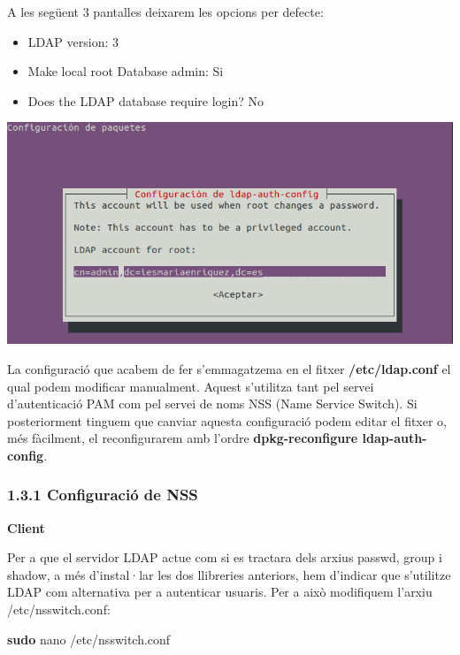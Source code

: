 \documentclass[
  12 pt,
  a4paper,
]{article}
\newenvironment{Shaded}{\begin{snugshade}}{\end{snugshade}}
\newcommand{\FunctionTok}[1]{\textcolor[rgb]{0.13,0.29,0.53}{\textbf{#1}}}
\newcommand{\NormalTok}[1]{#1}
\begin{document}
A les següent 3 pantalles deixarem les opcions per defecte:

\begin{itemize}
\item
  LDAP version: 3
\item
  Make local root Database admin: Si
\item
  Does the LDAP database require login? No
\end{itemize}

\includegraphics{png/libpam3.png}

La configuració que acabem de fer s'emmagatzema en el fitxer
\textbf{/etc/ldap.conf} el qual podem modificar manualment. Aquest
s'utilitza tant pel servei d'autenticació PAM com pel servei de noms NSS
(Name Service Switch). Si posteriorment tinguem que canviar aquesta
configuració podem editar el fitxer o, més fàcilment, el reconfigurarem
amb l'ordre \textbf{dpkg-reconfigure ldap-auth-config}.

\subsubsection{1.3.1 Configuració de NSS}\label{configuraciuxf3-de-nss}

\textbf{Client}

Per a que el servidor LDAP actue com si es tractara dels arxius passwd,
group i shadow, a més d'instal·lar les dos llibreries anteriors, hem
d'indicar que s'utilitze LDAP com alternativa per a autenticar usuaris.
Per a això modifiquem l'arxiu /etc/nsswitch.conf:

\begin{Shaded}
\begin{Highlighting}[]
\FunctionTok{sudo}\NormalTok{ nano /etc/nsswitch.conf}
\end{Highlighting}
\end{Shaded}
\end{document}
